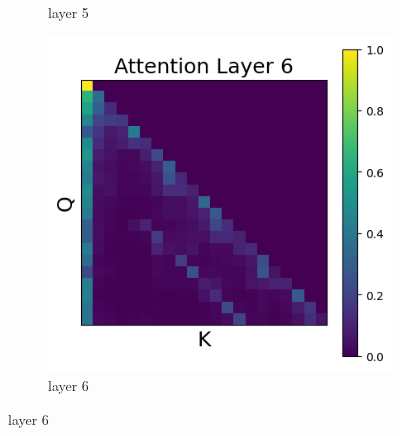 \documentclass[11pt]{article}
\begin{document}
\begin{figure}[t]
\begin{subfigure}[t]{0.24\textwidth}
    \caption{layer 5}
  \end{subfigure}\hfill
  \begin{subfigure}[t]{0.24\textwidth}
    \centering
    \includegraphics[width=1.4\columnwidth]{figures/intervention1/layer_6.png}
    \caption{layer 6}
  \end{subfigure}\hfill


\end{figure}
\end{document}
